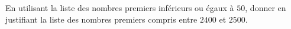 
En utilisant la liste des nombres premiers inférieurs ou égaux à $50$, donner en justifiant la liste des nombres premiers compris entre $2400$ et $2500$.




